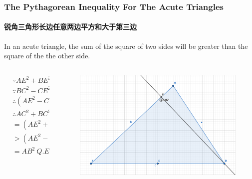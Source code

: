 \documentclass[
	11pt, %
]{beamer}
\begin{document}
\begin{frame}
	\frametitle{The Pythagorean Inequality For The Acute Triangles} %
	\framesubtitle{锐角三角形长边任意两边平方和大于第三边}
	\begin{theorem}
	In an acute triangle, the sum of the square of two sides will be greater than the square of the the other side. 
	\end{theorem}
	\begin{columns}[t] 
		\begin{column}{0.4\textwidth} %
			\begin{equation*}
				\begin{aligned}
					&\because AE^2 + BE^2 = AB^2\\
					&\because BC^2 - CE^2 =BE^2 \\
					&\therefore (AE^2 - CE^2) + BC^2 = AB^2 \\
					&\therefore AC^2 + BC^2 \\
					&= (AE^2 +2AE*CE + CE^2) + BC^2 \\
					&> (AE^2 - CE^2) + BC^2 \\
					&=AB^2 \ Q.E.D.
				\end{aligned}
			\end{equation*}	
		\end{column}
		\begin{column}{0.6\textwidth} %
			\begin{figure}
				\includegraphics[width=0.8\linewidth]{Pythagorean_Acute.png}
			\end{figure}	
		\end{column}
	\end{columns}
\end{frame}

\end{document}
